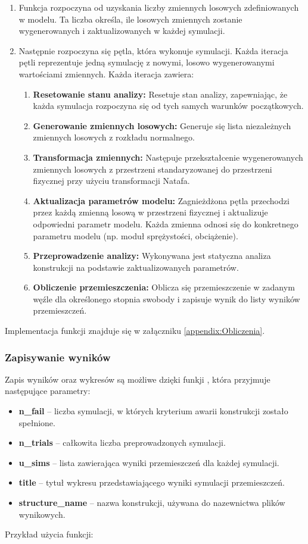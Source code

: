 \begin{enumerate}
    \item Funkcja rozpoczyna od uzyskania liczby zmiennych losowych zdefiniowanych w modelu. Ta liczba określa, ile losowych zmiennych zostanie wygenerowanych i zaktualizowanych w każdej symulacji.
    \item Następnie rozpoczyna się pętla, która wykonuje  symulacji. Każda iteracja pętli reprezentuje jedną symulację z nowymi, losowo wygenerowanymi wartościami zmiennych. Każda iteracja zawiera:
    \begin{enumerate}
        \item \textbf{Resetowanie stanu analizy:} Resetuje stan analizy, zapewniając, że każda symulacja rozpoczyna się od tych samych warunków początkowych.
        \item \textbf{Generowanie zmiennych losowych:} Generuje się lista niezależnych zmiennych losowych z rozkładu normalnego.
        \item \textbf{Transformacja zmiennych:} Następuje przekształcenie wygenerowanych zmiennych losowych z przestrzeni standaryzowanej do przestrzeni fizycznej przy użyciu transformacji Natafa.
        \item \textbf{Aktualizacja parametrów modelu:} Zagnieżdżona pętla przechodzi przez każdą zmienną losową w przestrzeni fizycznej i aktualizuje odpowiedni parametr modelu. Każda zmienna odnosi się do konkretnego parametru modelu (np. moduł sprężystości, obciążenie).
        \item \textbf{Przeprowadzenie analizy:} Wykonywana jest statyczna analiza konstrukcji na podstawie zaktualizowanych parametrów.
        \item \textbf{Obliczenie przemieszczenia:} Oblicza się przemieszczenie w zadanym węźle dla określonego stopnia swobody i zapisuje wynik do listy wyników przemieszczeń.
    \end{enumerate}
\end{enumerate}
Implementacja funkcji znajduje się w załączniku \ref{appendix:Obliczenia}.

\subsubsection*{Zapisywanie wyników}

Zapis wyników oraz wykresów są możliwe dzięki funkji , która przyjmuje następujące parametry:
\begin{itemize}
    \item \textbf{n\_fail} – liczba symulacji, w których kryterium awarii konstrukcji zostało spełnione.
    \item \textbf{n\_trials} – całkowita liczba preprowadzonych symulacji.
    \item \textbf{u\_sims} – lista zawierająca wyniki przemieszczeń dla każdej symulacji.
    \item \textbf{title} – tytuł wykresu przedstawiającego wyniki symulacji przemieszczeń.
    \item \textbf{structure\_name} – nazwa konstrukcji, używana do nazewnictwa plików wynikowych.
\end{itemize}
Przykład użycia funkcji:

